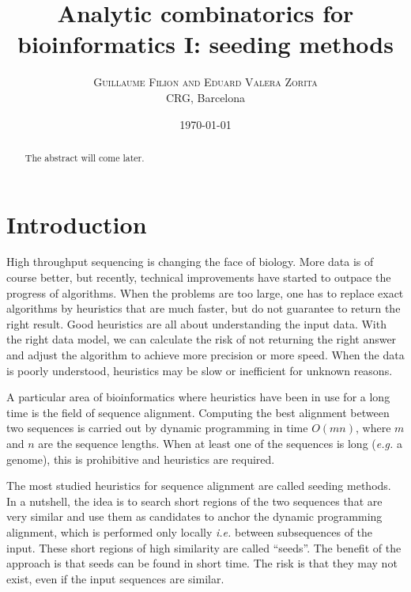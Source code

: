 \documentclass{article}
\title{Analytic combinatorics for bioinformatics I:
seeding methods}
\author{
\textsc{Guillaume Filion and Eduard Valera Zorita} \\ [1ex]
\normalsize CRG, Barcelona
}
\date{\today}
\begin{document}
\maketitle

\begin{abstract}
The abstract will come later.
\end{abstract}



\section{Introduction}

High throughput sequencing is changing the face of biology. More data is
of course better, but recently, technical improvements have started to
outpace the progress of algorithms. When the problems are too large,
one has to replace exact algorithms by heuristics that are much faster,
but do not guarantee to return the right result. Good heuristics are all
about understanding the input data. With the right data model, we can
calculate the risk of not returning the right answer and adjust the
algorithm to achieve more precision or more speed. When the data is poorly
understood, heuristics may be slow or inefficient for unknown reasons.

A particular area of bioinformatics where heuristics have been in use for
a long time is the field of sequence alignment. Computing the best
alignment between two sequences is carried out by dynamic programming in
time $O(mn)$, where $m$ and $n$ are the sequence lengths. When at least
one of the sequences is long (\textit{e.g.} a genome), this is prohibitive
and heuristics are required.

The most studied heuristics for sequence alignment are called seeding
methods. In a nutshell, the idea is to search short regions of the two
sequences that are very similar and use them as candidates to anchor the
dynamic programming alignment, which is performed only locally
\textit{i.e.} between subsequences of the input. These short regions of
high similarity are called ``seeds''. The benefit of the approach is that
seeds can be found in short time. The risk is that they may not exist,
even if the input sequences are similar.
\end{document}
